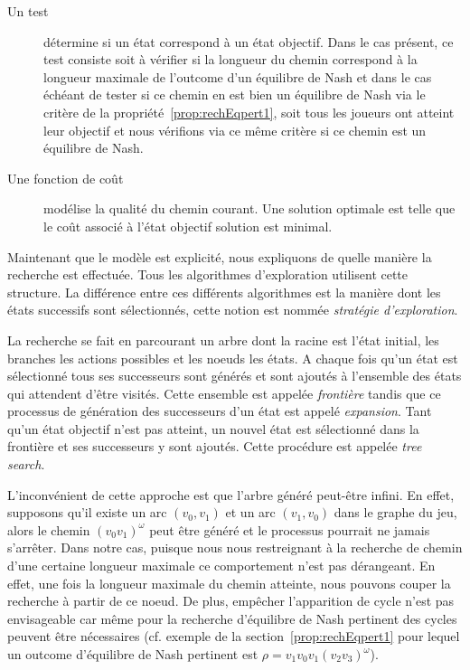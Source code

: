 \begin{description}
	\item[Un test] détermine si un état correspond à un état objectif. Dans le cas présent, ce test consiste soit à vérifier si la longueur du chemin correspond à la longueur maximale de l'outcome d'un équilibre de Nash et dans le cas échéant de tester si ce chemin en est bien un équilibre de Nash via le critère de la propriété~\ref{prop:rechEqpert1}, soit tous les joueurs ont atteint leur objectif et nous vérifions via ce même critère si ce chemin est un équilibre de Nash.
	
	\item[Une fonction de coût] modélise la qualité du chemin courant. Une solution optimale est telle que le coût associé à l'état objectif solution est minimal.
\end{description}

Maintenant que le modèle est explicité, nous expliquons de quelle manière la recherche est effectuée. Tous les algorithmes d'exploration utilisent cette structure. La différence entre ces différents algorithmes est la manière dont les états successifs sont sélectionnés, cette notion est nommée \emph{stratégie d'exploration}.

La recherche se fait en parcourant un arbre dont la racine est l'état initial, les branches les actions possibles et les noeuds les états. A chaque fois qu'un état est sélectionné tous ses successeurs sont générés et sont ajoutés à l'ensemble des états qui attendent d'être visités. Cette ensemble est appelée \emph{frontière} tandis que ce processus de génération des successeurs d'un état est appelé \emph{expansion}. Tant qu'un état objectif n'est pas atteint, un nouvel état est sélectionné dans la frontière et ses successeurs y sont ajoutés. Cette procédure est appelée \emph{tree search}.

L'inconvénient de cette approche est que l'arbre généré peut-être infini. En effet, supposons qu'il existe un arc $(v_0, v_1)$ et un arc $(v_1, v_0)$ dans le graphe du jeu, alors le chemin $ (v_0v_1)^{\omega}$ peut être généré et le processus pourrait ne jamais s'arrêter. Dans notre cas, puisque nous nous restreignant à la recherche de chemin d'une certaine longueur maximale ce comportement n'est pas dérangeant. En effet, une fois la longueur maximale du chemin atteinte, nous pouvons couper la recherche à partir de ce noeud. De plus, empêcher l'apparition de cycle n'est pas envisageable car même pour la recherche d'équilibre de Nash pertinent des cycles peuvent être nécessaires (cf. exemple de la section~\ref{prop:rechEqpert1} pour lequel un outcome  d'équilibre de Nash pertinent est $\rho = v_{1}v_{0}v_{1}(v_{2}v_{3})^{\omega} $).\\

